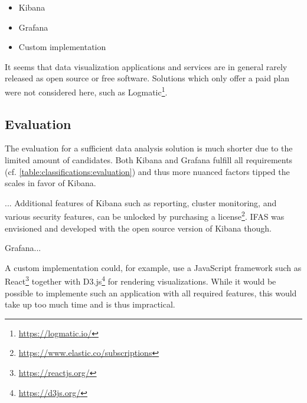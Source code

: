 \begin{itemize}[noitemsep]
\item Kibana
\item Grafana
\item Custom implementation
\end{itemize}

It seems that data visualization applications and services are in general rarely released as open source or free software.
Solutions which only offer a paid plan were not considered here, such as Logmatic\footnote{\url{https://logmatic.io/}}.

\subsection{Evaluation}

The evaluation for a sufficient data analysis solution is much shorter due to the limited amount of candidates.
Both Kibana and Grafana fulfill all requirements (cf. \cref{table:classifications:evaluation}) and thus more nuanced factors tipped the scales in favor of Kibana.

\begin{table}[t]
\centering
\caption{Classification of data analysis solutions.}
\label{table:classifications:evaluation}
\end{table}

...
Additional features of Kibana such as reporting, cluster monitoring, and various security features, can be unlocked by purchasing a license\footnote{\url{https://www.elastic.co/subscriptions}}.
\ac{IFAS} was envisioned and developed with the open source version of Kibana though.

Grafana...

A custom implementation could, for example, use a JavaScript framework such as React\footnote{\url{https://reactjs.org/}} together with D3.js\footnote{\url{https://d3js.org/}} for rendering visualizations.
While it would be possible to implemente such an application with all required features, this would take up too much time and is thus impractical.


